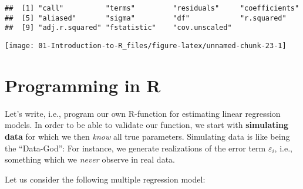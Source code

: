 \documentclass[
]{book}
\newenvironment{Shaded}{\begin{snugshade}}{\end{snugshade}}
\newcommand{\AttributeTok}[1]{\textcolor[rgb]{0.77,0.63,0.00}{#1}}
\newcommand{\DecValTok}[1]{\textcolor[rgb]{0.00,0.00,0.81}{#1}}
\newcommand{\DocumentationTok}[1]{\textcolor[rgb]{0.56,0.35,0.01}{\textbf{\textit{#1}}}}
\newcommand{\FunctionTok}[1]{\textcolor[rgb]{0.00,0.00,0.00}{#1}}
\newcommand{\NormalTok}[1]{#1}
\newcommand{\OtherTok}[1]{\textcolor[rgb]{0.56,0.35,0.01}{#1}}
\newcommand{\SpecialCharTok}[1]{\textcolor[rgb]{0.00,0.00,0.00}{#1}}
\newcommand{\StringTok}[1]{\textcolor[rgb]{0.31,0.60,0.02}{#1}}
\begin{document}
\begin{verbatim}
##  [1] "call"          "terms"         "residuals"     "coefficients" 
##  [5] "aliased"       "sigma"         "df"            "r.squared"    
##  [9] "adj.r.squared" "fstatistic"    "cov.unscaled"
\end{verbatim}

\begin{Shaded}
\end{Shaded}

\begin{center}\texttt{[image: 01-Introduction-to-R\_files/figure-latex/unnamed-chunk-23-1]} \end{center}

\hfill\break

\hypertarget{programming-in-r}{%
\section{Programming in R}\label{programming-in-r}}

Let's write, i.e., program our own R-function for estimating linear regression models. In order to be able to validate our function, we start with \textbf{simulating data} for which we then \emph{know} all true parameters. Simulating data is like being the ``Data-God'': For instance, we generate realizations of the error term \(\varepsilon_i\), i.e., something which we \emph{never} observe in real data.

\hfill\break

Let us consider the following multiple regression model:
\end{document}
